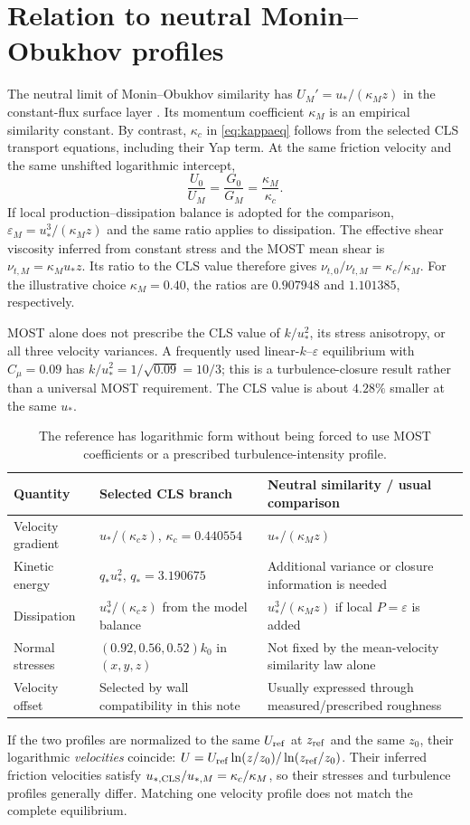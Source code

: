 \documentclass[11pt,a4paper]{article}
\numberwithin{equation}{section}
\newcommand{\eps}{\varepsilon}
\newcommand{\ust}{u_*}
\newcommand{\kc}{\kappa_c}
\newcommand{\qs}{q_*}
\begin{document}
\section{Relation to neutral Monin--Obukhov profiles}
\label{sec:most}
The neutral limit of Monin--Obukhov similarity has
$U_M'=\ust/(\kappa_M z)$ in the constant-flux surface layer
\cite{MoninObukhov1954}. Its momentum coefficient $\kappa_M$ is an empirical
similarity constant. By contrast, $\kc$ in \cref{eq:kappaeq} follows from
the selected CLS transport equations, including their Yap term.
At the same friction velocity and the same unshifted logarithmic intercept,
\begin{equation}
\frac{U_0}{U_M}=\frac{G_0}{G_M}
=\frac{\kappa_M}{\kc}.
\label{eq:MOSTratio}
\end{equation}
If local production--dissipation balance is adopted for the comparison,
$\eps_M=\ust^3/(\kappa_M z)$ and the same ratio applies to dissipation.
The effective shear viscosity inferred from constant stress and the
MOST mean shear is $\nu_{t,M}=\kappa_M\ust z$. Its ratio to the CLS
value therefore gives $\nu_{t,0}/\nu_{t,M}=\kc/\kappa_M$.
For the illustrative choice $\kappa_M=0.40$, the ratios are
$0.907948$ and $1.101385$, respectively.

MOST alone does not prescribe the CLS value of $k/\ust^2$, its stress
anisotropy, or all three velocity variances. A frequently used
linear-$k$--$\eps$ equilibrium with $C_\mu=0.09$ has
$k/\ust^2=1/\sqrt{0.09}=10/3$; this is a turbulence-closure result rather
than a universal MOST requirement. The CLS value is about $4.28\%$ smaller
at the same $\ust$.

\begin{table}[htbp]
\centering\small
\begin{tabularx}{\linewidth}{@{}lXX@{}}
\toprule
Quantity & Selected CLS branch & Neutral similarity / usual comparison\\
\midrule
Velocity gradient & $\ust/(\kc z)$, $\kc=0.440554$
& $\ust/(\kappa_M z)$\\
Kinetic energy & $\qs\ust^2$, $\qs=3.190675$
& Additional variance or closure information is needed\\
Dissipation & $\ust^3/(\kc z)$ from the model balance
& $\ust^3/(\kappa_M z)$ if local $P=\eps$ is added\\
Normal stresses & $(0.92,0.56,0.52)k_0$ in $(x,y,z)$
& Not fixed by the mean-velocity similarity law alone\\
Velocity offset & Selected by wall compatibility in this note
& Usually expressed through measured/prescribed roughness\\
\bottomrule
\end{tabularx}
\caption{The reference has logarithmic form without being forced to use
MOST coefficients or a prescribed turbulence-intensity profile.}
\end{table}
If the two profiles are normalized to the same $U_{\rm ref}$ at
$z_{\rm ref}$ and the same $z_0$, their logarithmic \emph{velocities} coincide:
$U=U_{\rm ref}\ln(z/z_0)/\ln(z_{\rm ref}/z_0)$.
Their inferred friction velocities satisfy
$u_{*,\rm CLS}/u_{*,M}=\kc/\kappa_M$, so their stresses and turbulence
profiles generally differ. Matching one velocity profile does not match
the complete equilibrium.
\FloatBarrier
\end{document}
